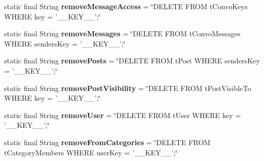 \begin{DoxyCompactItemize}
\item 
\hypertarget{classballmerpeak_1_1turtlenet_1_1server_1_1DBStrings_aa376b74543195cc63ee7e443131d2822}{static final String {\bfseries remove\-Message\-Access} = \char`\"{}D\-E\-L\-E\-T\-E F\-R\-O\-M t\-Convo\-Keys W\-H\-E\-R\-E key = '\-\_\-\-\_\-\-K\-E\-Y\-\_\-\-\_\-';\char`\"{}}\label{classballmerpeak_1_1turtlenet_1_1server_1_1DBStrings_aa376b74543195cc63ee7e443131d2822}

\item 
\hypertarget{classballmerpeak_1_1turtlenet_1_1server_1_1DBStrings_a1b06410e67831509b9f39c59360cd3a4}{static final String {\bfseries remove\-Messages} = \char`\"{}D\-E\-L\-E\-T\-E F\-R\-O\-M t\-Convo\-Messages W\-H\-E\-R\-E senders\-Key = '\-\_\-\-\_\-\-K\-E\-Y\-\_\-\-\_\-';\char`\"{}}\label{classballmerpeak_1_1turtlenet_1_1server_1_1DBStrings_a1b06410e67831509b9f39c59360cd3a4}

\item 
\hypertarget{classballmerpeak_1_1turtlenet_1_1server_1_1DBStrings_a558a3b46958bfa577aecc36b4f2c7b2f}{static final String {\bfseries remove\-Posts} = \char`\"{}D\-E\-L\-E\-T\-E F\-R\-O\-M t\-Post W\-H\-E\-R\-E senders\-Key = '\-\_\-\-\_\-\-K\-E\-Y\-\_\-\-\_\-';\char`\"{}}\label{classballmerpeak_1_1turtlenet_1_1server_1_1DBStrings_a558a3b46958bfa577aecc36b4f2c7b2f}

\item 
\hypertarget{classballmerpeak_1_1turtlenet_1_1server_1_1DBStrings_a2541bcdbb1f43144be6a70b42199b0d2}{static final String {\bfseries remove\-Post\-Visibility} = \char`\"{}D\-E\-L\-E\-T\-E F\-R\-O\-M t\-Post\-Visible\-To W\-H\-E\-R\-E key = '\-\_\-\-\_\-\-K\-E\-Y\-\_\-\-\_\-';\char`\"{}}\label{classballmerpeak_1_1turtlenet_1_1server_1_1DBStrings_a2541bcdbb1f43144be6a70b42199b0d2}

\item 
\hypertarget{classballmerpeak_1_1turtlenet_1_1server_1_1DBStrings_a7280cd9a150a098b62c0d23a88eeb566}{static final String {\bfseries remove\-User} = \char`\"{}D\-E\-L\-E\-T\-E F\-R\-O\-M t\-User W\-H\-E\-R\-E key = '\-\_\-\-\_\-\-K\-E\-Y\-\_\-\-\_\-';\char`\"{}}\label{classballmerpeak_1_1turtlenet_1_1server_1_1DBStrings_a7280cd9a150a098b62c0d23a88eeb566}

\item 
\hypertarget{classballmerpeak_1_1turtlenet_1_1server_1_1DBStrings_a34489c428648e96854f7ae0665fa2830}{static final String {\bfseries remove\-From\-Categories} = \char`\"{}D\-E\-L\-E\-T\-E F\-R\-O\-M t\-Category\-Members W\-H\-E\-R\-E user\-Key = '\-\_\-\-\_\-\-K\-E\-Y\-\_\-\-\_\-';\char`\"{}}\label{classballmerpeak_1_1turtlenet_1_1server_1_1DBStrings_a34489c428648e96854f7ae0665fa2830}


\end{DoxyCompactItemize}
